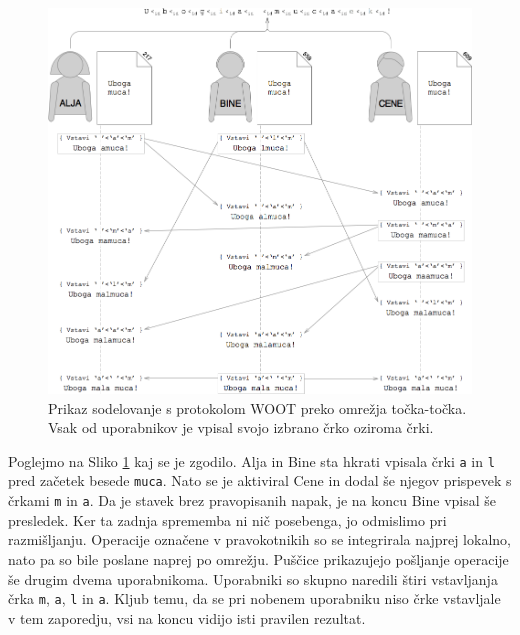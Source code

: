 \documentclass[a4paper, 12pt, twoside]{book}
\begin{document}
\begin{figure}[placement h]
\begin{center}
\includegraphics[width=13cm]{woot6.png}
\end{center}
\caption{Prikaz sodelovanje s protokolom WOOT preko omrežja točka-točka. Vsak od uporabnikov je vpisal svojo izbrano črko oziroma črki.}
\label{woot6}
\end{figure}

Poglejmo na Sliko \ref{woot6} kaj se je zgodilo. Alja in Bine sta hkrati vpisala črki {\tt a} in {\tt l} pred začetek besede {\tt muca}. Nato se je aktiviral Cene in dodal še njegov prispevek s črkami {\tt m} in {\tt a}. Da je stavek brez pravopisanih napak, je na koncu Bine vpisal še presledek. Ker ta zadnja sprememba ni nič posebenga, jo odmislimo pri razmišljanju. Operacije označene v pravokotnikih so se integrirala najprej lokalno, nato pa so bile poslane naprej po omrežju. Puščice prikazujejo pošljanje operacije še drugim dvema uporabnikoma. Uporabniki so skupno naredili štiri vstavljanja črka {\tt m}, {\tt a}, {\tt l} in {\tt a}. Kljub temu, da se pri nobenem uporabniku niso črke vstavljale v tem zaporedju, vsi na koncu vidijo isti pravilen rezultat.
\end{document}

